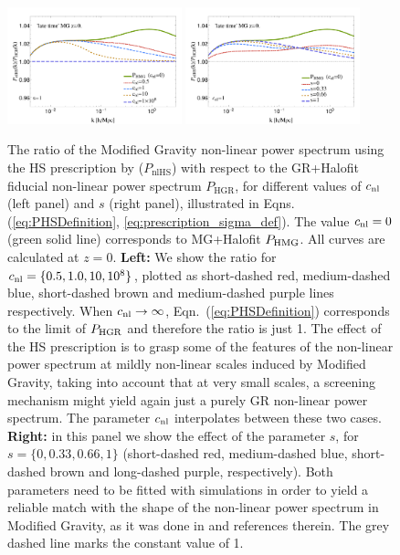 \begin{figure}[htbp]
\begin{centering}
\includegraphics[width=0.45\textwidth]{Chapters/linear-nonlinear-MG-forecasts/figures/power-spectra/pk-Ratios-ZhaovsGRNL-MGDE2nonuhs-z_0p-zind_1}
\includegraphics[width=0.45\textwidth]{Chapters/linear-nonlinear-MG-forecasts/figures/power-spectra/pk-Ratios-Zhao_SigmaExp-vsGRNL-MGDE2nonuhs-z_0p-zind_1} 
\end{centering}
\caption[Effect of the non-linear Hu\&\ Sawicki prescription]{\label{fig:lin-nonlin-Zhao-MG} The ratio of the Modified Gravity non-linear
power spectrum using the HS prescription by \cite{hu_parameterized_2007}
($P_{\mathrm{nlHS}}$) with respect to the GR+Halofit fiducial non-linear power spectrum $P_{\mathrm{HGR}}$, 
for different values of $c_{\mathrm{nl}}$ (left panel) and $s$ (right panel),
illustrated in Eqns.(\ref{eq:PHSDefinition}, \ref{eq:prescription_sigma_def}).
The value $c_{\mathrm{nl}}=0$ (green solid line) corresponds
to MG+Halofit $P_{\mathrm{HMG}}$.
All curves are calculated at $z=0$.
\textbf{Left: } We show the ratio for $c_{\mathrm{nl}}=\{0.5,1.0,10,10^8\}$,
plotted as short-dashed red, medium-dashed blue, short-dashed brown and medium-dashed purple
lines respectively. When $c_{\mathrm{nl}}\rightarrow\infty$, Eqn.\ (\ref{eq:PHSDefinition})
corresponds to the limit of $P_{\mathrm{HGR}}$ and therefore the ratio is
just 1. The effect of the HS prescription
is to grasp some of the features of the non-linear power spectrum
at mildly non-linear scales induced by Modified Gravity, taking into
account that at very small scales, a screening mechanism might yield
again just a purely GR non-linear power spectrum. The parameter $c_{\mathrm{nl}}$
interpolates between these two cases. \textbf{Right: }in this panel
we show the effect of the parameter $s$, for $s=\{0,0.33,0.66,1\}$
(short-dashed red, medium-dashed blue, short-dashed brown and long-dashed
purple, respectively). Both parameters need to be fitted with simulations
in order to yield a reliable match with the shape of the non-linear
power spectrum in Modified Gravity, as it was done in \cite{zhao_n-body_2011}
and references therein. The grey dashed line marks the constant value of 1.}
\end{figure}



